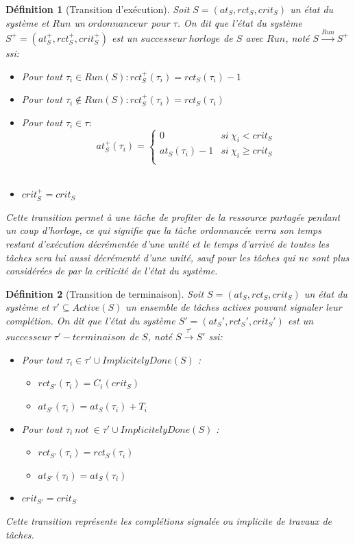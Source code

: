 \documentclass[a4paper]{report}
\theoremstyle{break}
\newtheorem{defin}{Définition}
\theoremstyle{breakplain}
\begin{document}
\begin{defin}[Transition d'exécution]
Soit $S = (at_S, rct_S, crit_S)$ un état du système et $Run$ un $ordonnanceur$ pour $\tau$. On dit que l'état du système $S^+ = (at_S^+, rct_S^+, crit_S^+)$ est un $successeur\ horloge$ de $S$ avec $Run$, noté $S\xrightarrow{Run}S^+$ ssi:
\begin{itemize}
\item Pour tout $\tau_i \in Run(S) : rct_S^+(\tau_i) = rct_S(\tau_i)-1$\\
\item Pour tout $\tau_i \not \in Run(S) : rct_S^+(\tau_i) = rct_S(\tau_i)$\\
\item Pour tout $\tau_i \in \tau :$
$$ at_S^+(\tau_i) = \left\{
    \begin{array}{ll}
        0 & si\ \chi_i < crit_S \\
        at_S(\tau_i)-1 & si\ \chi_i \geq crit_S \\
    \end{array}
\right.
$$\\
\item $crit_{S}^{+} = crit_{S}$

\end{itemize}
Cette transition permet à une tâche de profiter de la ressource partagée pendant un coup d'horloge, ce qui signifie que la tâche ordonnancée verra son temps restant d'exécution décrémentée d'une unité et le temps d'arrivé de toutes les tâches sera lui aussi décrémenté d'une unité, sauf pour les tâches qui ne sont plus considérées de par la criticité de l'état du système.
\end{defin}

\begin{defin}[Transition de terminaison]
Soit $S = (at_S, rct_S, crit_S)$ un état du système et $\tau' \subseteq Active(S)$ un ensemble de tâches actives pouvant signaler leur complétion. On dit que l'état du système $S' = (at_S', rct_S', crit_S')$ est un $successeur\ \tau'-terminaison$ de $S$, noté $S\xrightarrow{\tau'}S'$ ssi:
\begin{itemize}
\item Pour tout $\tau_i \in \tau' \cup ImplicitelyDone(S)$ :\begin{itemize}
\item $rct_{S'}(\tau_i) = C_i(crit_S)$
\item $at_{S'}(\tau_i) = at_{S}(\tau_i)+T_i$
\end{itemize}

\item Pour tout $\tau_i\ not\ \in \tau' \cup ImplicitelyDone(S)$ :\begin{itemize}
\item $rct_{S'}(\tau_i) = rct_{S}(\tau_i)$
\item $at_{S'}(\tau_i) = at_{S}(\tau_i)$
\end{itemize}
\item $crit_{S'} = crit_{S}$

\end{itemize}
Cette transition représente les complétions signalée ou implicite de travaux de tâches.
\end{defin}
\end{document}
